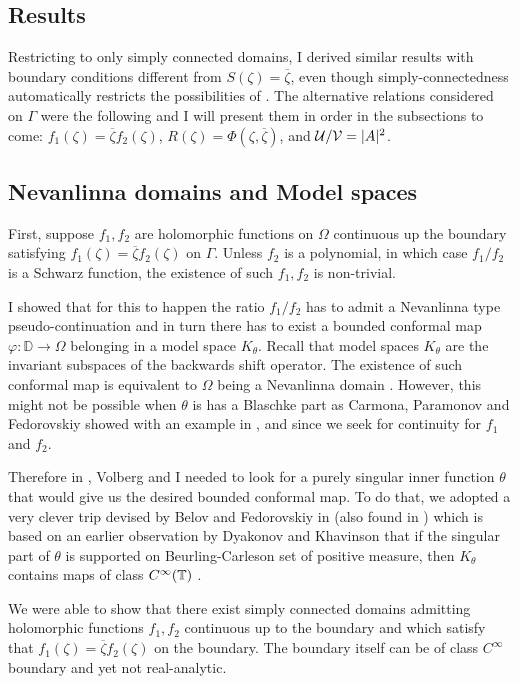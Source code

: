 \documentclass[11pt]{amsart} %
\theoremstyle{remark} %
\theoremstyle{definition} %
\numberwithin{equation}{section} %
\def \D{{\mathbb{D}}}	\def \J{{\mathbb{J}}}	\def \P{{\mathbb{P}}}	\def \V{{\mathbb{V}}}
\newcommand{\0}[1]{\overline{#1}} %
\newcommand{\1}[1]{\tilde{#1}} %
\newcommand{\2}[1]{{}_{|#1}} %
\begin{document}
\subsection*{Results}	%
Restricting to only simply connected domains, I derived similar results with boundary conditions different from $S(ζ)=\0{ζ}$, even though simply-connectedness automatically restricts the possibilities of . The alternative relations considered on $Γ$ were the following and I will present them in order in the subsections to come: $f_1(ζ)=\0{ζ}f_2(ζ)$, $R(ζ)=Φ(ζ,\0{ζ})$, and ${\mathcal{U}}/{\mathcal{V}}=|A|^2$.

\subsection{Nevanlinna domains and Model spaces}
First, suppose $f_1,f_2$ are holomorphic functions on $Ω$ continuous up the boundary satisfying $f_1(ζ)=\0{ζ}f_2(ζ)$ on $Γ$. Unless $f_2$ is a polynomial, in which case $f_1/f_2$ is a Schwarz function, the existence of such $f_1,f_2$ is non-trivial.

I showed that for this to happen the ratio $f_1/f_2$ has to admit a Nevanlinna type pseudo-continuation and in turn there has to exist a bounded conformal map $φ:\D\to Ω$ belonging in a model space $K_θ$. Recall that model spaces $K_θ$ are the invariant subspaces of the backwards shift operator. The existence of such conformal map is equivalent to $Ω$ being a Nevanlinna domain \cite{Fed2006,BarFed2011}. However, this might not be possible when $θ$ is has a Blaschke part as Carmona, Paramonov and Fedorovskiy showed with an example in \cite[Example 5.8]{CarParFed2002}, and since we seek for continuity for $f_1$ and $f_2$.

Therefore in \cite{VarVol2021ep_2022}, Volberg and I needed to look for a purely singular inner function $θ$ that would give us the desired bounded conformal map. To do that, we adopted a very clever trip devised by Belov and Fedorovskiy in \cite{BelFed2018} (also found in \cite{BarBelBorFed2017}) which is based on an earlier observation by Dyakonov and Khavinson that if the singular part of $θ$ is supported on Beurling-Carleson set of positive measure, then $K_θ$ contains maps of class $C^\infty({\mathbb{T}})$ \cite{DyaKha2006}.

We were able to show that there exist simply connected domains admitting holomorphic functions $f_1,f_2$ continuous up to the boundary and which satisfy that $f_1(ζ)=\0{ζ}f_2(ζ)$ on the boundary. The boundary itself can be of class $C^\infty$ boundary and yet not real-analytic.
\end{document}
